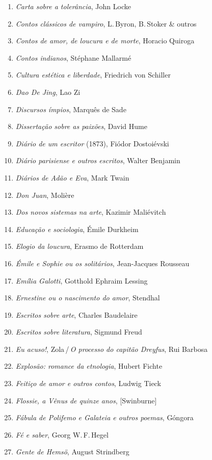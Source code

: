 \begin{enumerate}
\item \textit{Carta sobre a tolerância}, John Locke
\item \textit{Contos clássicos de vampiro}, L.\,Byron, B.\,Stoker \& outros
\item \textit{Contos de amor, de loucura e de morte}, Horacio Quiroga
\item \textit{Contos indianos}, Stéphane Mallarmé
\item \textit{Cultura estética e liberdade}, Friedrich von Schiller
\item \textit{Dao De Jing}, Lao Zi
\item \textit{Discursos ímpios}, Marquês de Sade
\item \textit{Dissertação sobre as paixões}, David Hume
\item \textit{Diário de um escritor} (1873), Fiódor Dostoiévski
\item \textit{Diário parisiense e outros escritos}, Walter Benjamin
\item \textit{Diários de Adão e Eva}, Mark Twain
\item \textit{Don Juan}, Molière
\item \textit{Dos novos sistemas na arte}, Kazimir Maliévitch
\item \textit{Educação e sociologia}, Émile Durkheim
\item \textit{Elogio da loucura}, Erasmo de Rotterdam
\item \textit{Émile e Sophie ou os solitários}, Jean-Jacques Rousseau 
\item \textit{Emília Galotti}, Gotthold Ephraim Lessing
\item \textit{Ernestine ou o nascimento do amor}, Stendhal
\item \textit{Escritos sobre arte}, Charles Baudelaire
\item \textit{Escritos sobre literatura}, Sigmund Freud
\item \textit{Eu acuso!}, Zola\,/\,\textit{O processo do capitão Dreyfus}, Rui Barbosa
\item \textit{Explosão: romance da etnologia}, Hubert Fichte
\item \textit{Feitiço de amor e outros contos}, Ludwig Tieck
\item \textit{Flossie, a Vênus de quinze anos}, [Swinburne]
\item \textit{Fábula de Polifemo e Galateia e outros poemas}, Góngora
\item \textit{Fé e saber}, Georg W.\,F.\,Hegel
\item \textit{Gente de Hemsö}, August Strindberg 

\end{enumerate}
